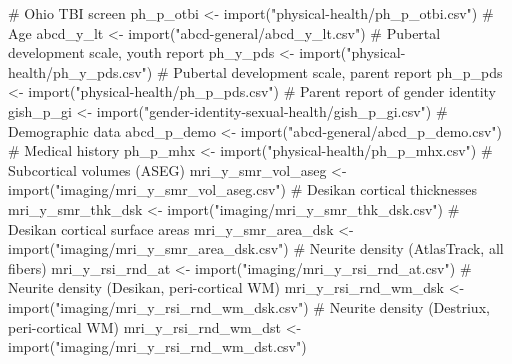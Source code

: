 \documentclass[
  letterpaper,
  DIV=11,
  numbers=noendperiod]{scrreprt}
\newenvironment{Shaded}{\begin{snugshade}}{\end{snugshade}}
\newcommand{\CommentTok}[1]{\textcolor[rgb]{0.37,0.37,0.37}{#1}}
\newcommand{\FunctionTok}[1]{\textcolor[rgb]{0.28,0.35,0.67}{#1}}
\newcommand{\NormalTok}[1]{\textcolor[rgb]{0.00,0.23,0.31}{#1}}
\newcommand{\OtherTok}[1]{\textcolor[rgb]{0.00,0.23,0.31}{#1}}
\newcommand{\StringTok}[1]{\textcolor[rgb]{0.13,0.47,0.30}{#1}}
\begin{document}
\begin{Shaded}
\begin{Highlighting}[]
\CommentTok{\# Ohio TBI screen}
\NormalTok{ph\_p\_otbi }\OtherTok{\textless{}{-}} \FunctionTok{import}\NormalTok{(}\StringTok{"physical{-}health/ph\_p\_otbi.csv"}\NormalTok{)}
\CommentTok{\# Age}
\NormalTok{abcd\_y\_lt }\OtherTok{\textless{}{-}} \FunctionTok{import}\NormalTok{(}\StringTok{"abcd{-}general/abcd\_y\_lt.csv"}\NormalTok{)}
\CommentTok{\# Pubertal development scale, youth report}
\NormalTok{ph\_y\_pds }\OtherTok{\textless{}{-}} \FunctionTok{import}\NormalTok{(}\StringTok{"physical{-}health/ph\_y\_pds.csv"}\NormalTok{)}
\CommentTok{\# Pubertal development scale, parent report}
\NormalTok{ph\_p\_pds }\OtherTok{\textless{}{-}} \FunctionTok{import}\NormalTok{(}\StringTok{"physical{-}health/ph\_p\_pds.csv"}\NormalTok{)}
\CommentTok{\# Parent report of gender identity}
\NormalTok{gish\_p\_gi }\OtherTok{\textless{}{-}} \FunctionTok{import}\NormalTok{(}\StringTok{"gender{-}identity{-}sexual{-}health/gish\_p\_gi.csv"}\NormalTok{)}
\CommentTok{\# Demographic data}
\NormalTok{abcd\_p\_demo }\OtherTok{\textless{}{-}} \FunctionTok{import}\NormalTok{(}\StringTok{"abcd{-}general/abcd\_p\_demo.csv"}\NormalTok{)}
\CommentTok{\# Medical history}
\NormalTok{ph\_p\_mhx }\OtherTok{\textless{}{-}} \FunctionTok{import}\NormalTok{(}\StringTok{"physical{-}health/ph\_p\_mhx.csv"}\NormalTok{)}
\CommentTok{\# Subcortical volumes (ASEG)}
\NormalTok{mri\_y\_smr\_vol\_aseg }\OtherTok{\textless{}{-}} \FunctionTok{import}\NormalTok{(}\StringTok{"imaging/mri\_y\_smr\_vol\_aseg.csv"}\NormalTok{)}
\CommentTok{\# Desikan cortical thicknesses}
\NormalTok{mri\_y\_smr\_thk\_dsk }\OtherTok{\textless{}{-}} \FunctionTok{import}\NormalTok{(}\StringTok{"imaging/mri\_y\_smr\_thk\_dsk.csv"}\NormalTok{)}
\CommentTok{\# Desikan cortical surface areas}
\NormalTok{mri\_y\_smr\_area\_dsk }\OtherTok{\textless{}{-}} \FunctionTok{import}\NormalTok{(}\StringTok{"imaging/mri\_y\_smr\_area\_dsk.csv"}\NormalTok{)}
\CommentTok{\# Neurite density (AtlasTrack, all fibers)}
\NormalTok{mri\_y\_rsi\_rnd\_at }\OtherTok{\textless{}{-}} \FunctionTok{import}\NormalTok{(}\StringTok{"imaging/mri\_y\_rsi\_rnd\_at.csv"}\NormalTok{)}
\CommentTok{\# Neurite density (Desikan, peri{-}cortical WM)}
\NormalTok{mri\_y\_rsi\_rnd\_wm\_dsk }\OtherTok{\textless{}{-}} \FunctionTok{import}\NormalTok{(}\StringTok{"imaging/mri\_y\_rsi\_rnd\_wm\_dsk.csv"}\NormalTok{)}
\CommentTok{\# Neurite density (Destriux, peri{-}cortical WM)}
\NormalTok{mri\_y\_rsi\_rnd\_wm\_dst }\OtherTok{\textless{}{-}} \FunctionTok{import}\NormalTok{(}\StringTok{"imaging/mri\_y\_rsi\_rnd\_wm\_dst.csv"}\NormalTok{)}

\end{Highlighting}
\end{Shaded}
\end{document}
